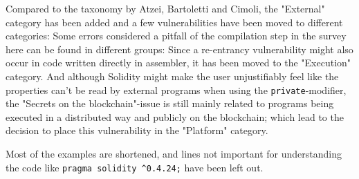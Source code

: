 Compared to the taxonomy by Atzei, Bartoletti and Cimoli, the "External" category has been added and a few vulnerabilities have been moved to different categories: Some errors considered a pitfall of the compilation step in the survey here can be found in different groups: Since a re-entrancy vulnerability might also occur in code written directly in assembler, it has been moved to the "Execution" category. And although Solidity might make the user unjustifiably feel like the properties can't be read by external programs when using the \texttt{private}-modifier, the "Secrets on the blockchain"-issue is still mainly related to programs being executed in a distributed way and publicly on the blockchain; which lead to the decision to place this vulnerability in the "Platform" category.

Most of the examples are shortened, and lines not important for understanding the code like \texttt{pragma solidity ^0.4.24;} have been left out.









\pagebreak{}

